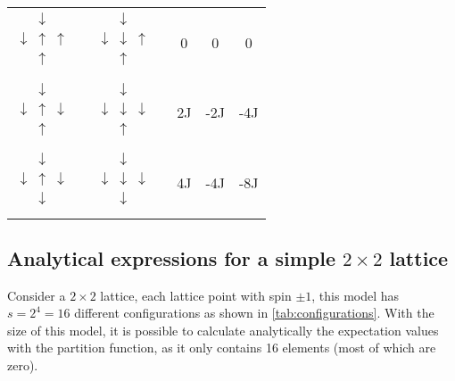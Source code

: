 \documentclass[../main.tex]{subfiles}
\begin{document}
\begin{table}[!htb]
\begin{center}
\begin{tabular}{ c c c c c}
$\begin{matrix}& \downarrow & \\ \downarrow & \uparrow & \uparrow \\ & \uparrow & \\ & & & \end{matrix}$     & $\begin{matrix}& \downarrow & \\ \downarrow & \downarrow & \uparrow \\ & \uparrow & \\ & & & \end{matrix}$ & 0 & 0   & 0                  \\
$\begin{matrix}& \downarrow & \\ \downarrow & \uparrow & \downarrow \\ & \uparrow & \\ & & & \end{matrix}$   & $\begin{matrix}& \downarrow & \\ \downarrow & \downarrow & \downarrow \\ & \uparrow & \\ & & & \end{matrix}$ & 2J & -2J  & -4J                 \\
$\begin{matrix}& \downarrow & \\ \downarrow & \uparrow & \downarrow \\ & \downarrow & \\ & & & \end{matrix}$ & $\begin{matrix}& \downarrow & \\ \downarrow & \downarrow & \downarrow \\ & \downarrow & \\ & & & \end{matrix}$ & 4J & -4J & -8J                 \\ 

\bottomrule
\end{tabular}
\end{center}
\label{tab:possible-delta-E}
\end{table}

\subsection{Analytical expressions for a simple \ensuremath{2\times2} lattice}\label{sec:analytical-L2}
Consider a $2\times2$ lattice, each lattice point with spin $\pm1$, this model has \ensuremath{s=2^4=16} different configurations as shown in \cref{tab:configurations}. With the size of this model, it is possible to calculate analytically the expectation values with the partition function, as it only contains 16 elements (most of which are zero).
\end{document}
